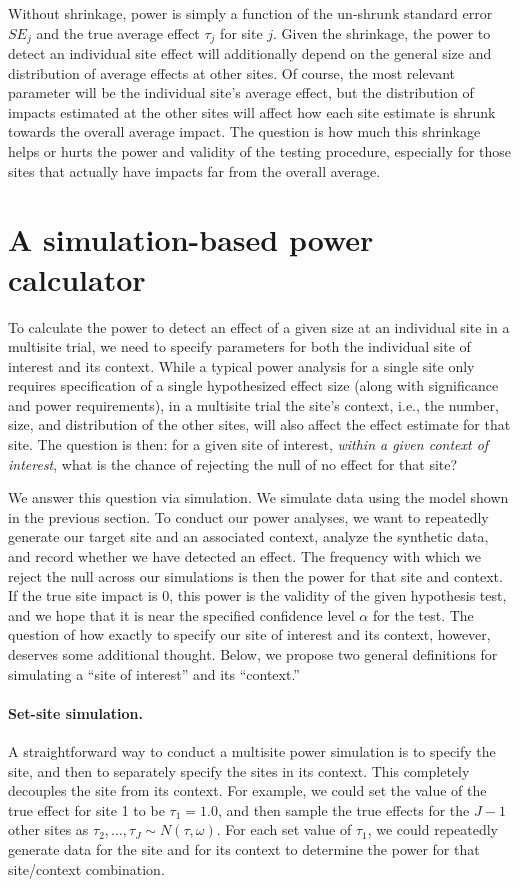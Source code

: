 \documentclass[]{article}
\begin{document}
Without shrinkage, power is simply a function of the un-shrunk standard error $SE_j$ and the true average effect $\tau_j$ for site $j$.
Given the shrinkage, the power to detect an individual site effect will additionally depend on the general size and distribution of average effects at other sites.
Of course, the most relevant parameter will be the individual site's average effect, but the distribution of impacts estimated at the other sites will affect how each site estimate is shrunk towards the overall average impact.
The question is how much this shrinkage helps or hurts the power and validity of the testing procedure, especially for those sites that actually have impacts far from the overall average.


\section{A simulation-based power calculator}

To calculate the power to detect an effect of a given size at an individual site in a multisite trial, we need to specify parameters for both the individual site of interest and its context.
While a typical power analysis for a single site only requires specification of a single hypothesized effect size (along with significance and power requirements), in a multisite trial the site's context, i.e., the number, size, and distribution of the other sites, will also affect the effect estimate for that site.
The question is then: for a given site of interest, \textit{within a given context of interest}, what is the chance of rejecting the null of no effect for that site?

We answer this question via simulation.
We simulate data using the model shown in the previous section.
To conduct our power analyses, we want to repeatedly generate our target site and an associated context, analyze the synthetic data, and record whether we have detected an effect.
The frequency with which we reject the null across our simulations is then the power for that site and context.
If the true site impact is 0, this power is the validity of the given hypothesis test, and we hope that it is near the specified confidence level $\alpha$ for the test.
The question of how exactly to specify our site of interest and its context, however, deserves some additional thought.
Below, we propose two general definitions for simulating a ``site of interest'' and its ``context.''

\paragraph{Set-site simulation.} A straightforward way to conduct a multisite power simulation is to specify the site, and then to separately specify the sites in its context.
This completely decouples the site from its context.
For example, we could set the value of the true effect for site 1 to be $\tau_1 = 1.0$, and then sample the true effects for the $J-1$ other sites as $\tau_2, \dots, \tau_J \sim N(\tau, \omega)$.
For each set value of $\tau_1$, we could repeatedly generate data for the site and for its context to determine the power for that site/context combination.
\end{document}
